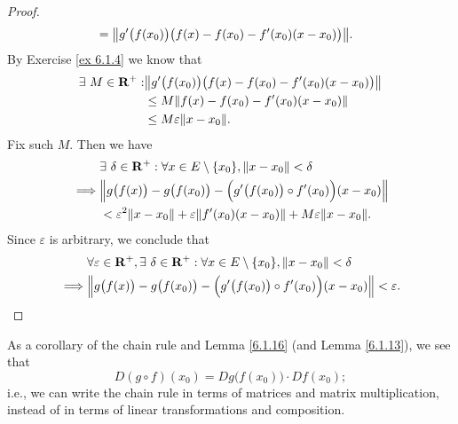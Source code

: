 \begin{proof}
\begin{align*}
         & = \norm*{g'\big(f(x_0)\big) \big(f(x) - f(x_0) - f'(x_0) (x - x_0)\big)}.
    \end{align*}
    By Exercise \ref{ex 6.1.4} we know that
    \begin{align*}
        \exists\ M \in \R^+ : & \norm*{g'\big(f(x_0)\big) \big(f(x) - f(x_0) - f'(x_0) (x - x_0)\big)} \\
                              & \leq M \norm*{f(x) - f(x_0) - f'(x_0) (x - x_0)}                       \\
                              & \leq M \varepsilon \norm*{x - x_0}.
    \end{align*}
    Fix such \(M\).
    Then we have
    \begin{align*}
                 & \exists\ \delta \in \R^+ : \forall x \in E \setminus \{x_0\}, \norm*{x - x_0} < \delta                  \\
        \implies & \norm*{g\big(f(x)\big) - g\big(f(x_0)\big) - \Big(g'\big(f(x_0)\big) \circ f'(x_0)\Big) (x - x_0)}      \\
                 & < \varepsilon^2 \norm*{x - x_0} + \varepsilon \norm*{f'(x_0)(x - x_0)} + M \varepsilon \norm*{x - x_0}.
    \end{align*}
    Since \(\varepsilon\) is arbitrary, we conclude that
    \begin{align*}
                 & \forall \varepsilon \in \R^+, \exists\ \delta \in \R^+ : \forall x \in E \setminus \{x_0\}, \norm*{x - x_0} < \delta \\
        \implies & \norm*{g\big(f(x)\big) - g\big(f(x_0)\big) - \Big(g'\big(f(x_0)\big) \circ f'(x_0)\Big) (x - x_0)} < \varepsilon.
    \end{align*}
\end{proof}

\begin{note}
    As a corollary of the chain rule and Lemma \ref{6.1.16} (and Lemma \ref{6.1.13}), we see that
    \[
        D (g \circ f)(x_0) = D g\big(f(x_0)\big) \cdot D f(x_0);
    \]
    i.e., we can write the chain rule in terms of matrices and matrix multiplication, instead of in terms of linear transformations and composition.
\end{note}

